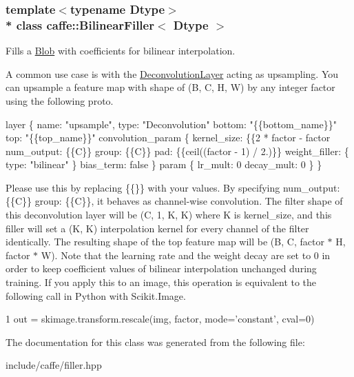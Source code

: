 \subsubsection*{template$<$typename Dtype$>$\\*
class caffe\+::\+Bilinear\+Filler$<$ Dtype $>$}

Fills a \hyperlink{classcaffe_1_1Blob}{Blob} with coefficients for bilinear interpolation. 

A common use case is with the \hyperlink{classcaffe_1_1DeconvolutionLayer}{Deconvolution\+Layer} acting as upsampling. You can upsample a feature map with shape of (B, C, H, W) by any integer factor using the following proto. 
\begin{DoxyCode}
layer \{
  name: \textcolor{stringliteral}{"upsample"}, type: \textcolor{stringliteral}{"Deconvolution"}
  bottom: \textcolor{stringliteral}{"\{\{bottom\_name\}\}"} top: \textcolor{stringliteral}{"\{\{top\_name\}\}"}
  convolution\_param \{
    kernel\_size: \{\{2 * factor - factor %
    num\_output: \{\{C\}\} group: \{\{C\}\}
    pad: \{\{ceil((factor - 1) / 2.)\}\}
    weight\_filler: \{ type: \textcolor{stringliteral}{"bilinear"} \} bias\_term: \textcolor{keyword}{false}
  \}
  param \{ lr\_mult: 0 decay\_mult: 0 \}
\}
\end{DoxyCode}
 Please use this by replacing {\ttfamily \{\{\}\}} with your values. By specifying {\ttfamily num\+\_\+output\+: \{\{C\}\} group\+: \{\{C\}\}}, it behaves as channel-\/wise convolution. The filter shape of this deconvolution layer will be (C, 1, K, K) where K is {\ttfamily kernel\+\_\+size}, and this filler will set a (K, K) interpolation kernel for every channel of the filter identically. The resulting shape of the top feature map will be (B, C, factor $\ast$ H, factor $\ast$ W). Note that the learning rate and the weight decay are set to 0 in order to keep coefficient values of bilinear interpolation unchanged during training. If you apply this to an image, this operation is equivalent to the following call in Python with Scikit.\+Image. 
\begin{DoxyCode}
1 out = skimage.transform.rescale(img, factor, mode=\textcolor{stringliteral}{'constant'}, cval=0)
\end{DoxyCode}
 

The documentation for this class was generated from the following file\+:\begin{DoxyCompactItemize}
\item 
include/caffe/filler.\+hpp\end{DoxyCompactItemize}
